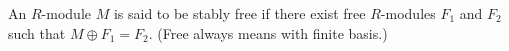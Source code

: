 An $R$-module $M$ is said to be stably free if there exist free $R$-modules $F_1$ and $F_2$ such that $M \oplus F_1 = F_2$. (Free always means with finite basis.)
